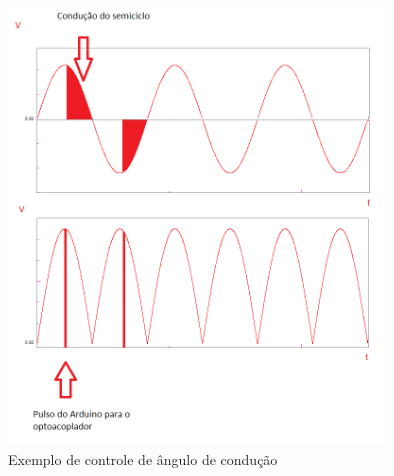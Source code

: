 \begin{figure}[H]

\center

\includegraphics[width=10cm]{imagens/pulso_arduino.png}

\label{Exemplo de controle de ângulo de condução}

\caption{Exemplo de controle de ângulo de condução}
\end{figure}

